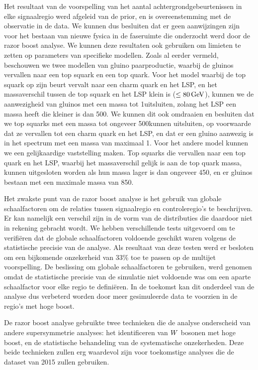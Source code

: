 Het resultaat van de voorspelling van het aantal achtergrondgebeurtenissen in elke signaalregio werd
afgeleid van de prior, en is overeenstemming met de observatie in de data. We kunnen dus besluiten
dat er geen aanwijzingen zijn voor het bestaan van nieuwe fysica in de faseruimte die onderzocht
werd door de razor boost analyse. We kunnen deze resultaten ook gebruiken om limieten te zetten op
parameters van specifieke modellen. Zoals al eerder vermeld, beschouwen we twee modellen van gluino
paarproductie, waarbij de gluinos vervallen naar een top squark en een top quark. Voor het model
waarbij de top squark op zijn beurt vervalt naar een charm quark en het LSP, en het massaverschil
tussen de top squark en het LSP klein is ($\leq 80\,\text{Ge\hspace{-.08em}V}$), kunnen we de aanwezigheid van gluinos met
een massa tot 1\TeV uitsluiten, zolang het LSP een massa heeft die kleiner is dan 500\GeV. We kunnen
dit ook omdraaien en besluiten dat we top squarks met een massa tot ongeveer 500\GeV kunnen
uitsluiten, op voorwaarde dat ze vervallen tot een charm quark en het LSP, en dat er een gluino
aanwezig is in het spectrum met een massa van maximaal 1\TeV. 
Voor het andere model kunnen we een gelijkaardige vaststelling maken. Top squarks die vervallen
naar een top quark en het LSP, waarbij het massaverschil gelijk is aan de top quark massa, kunnen
uitgesloten worden als hun massa lager is dan ongeveer 450\GeV, en er gluinos bestaan met een
maximale massa van 850\GeV. 

Het zwakste punt van de razor boost analyse is het gebruik van globale schaalfactoren om de
relaties tussen signaalregio en controleregio's te beschrijven. Er kan namelijk een verschil zijn
in de vorm van de distributies die daardoor niet in rekening gebracht wordt. We hebben
verschillende tests uitgevoerd om te verifi\"eren dat de globale schaalfactoren voldoende geschikt
waren volgens de statistische precisie van de analyse. Als resultaat van deze testen werd er
besloten om een bijkomende onzekerheid van 33\% toe te passen op de multijet voorspelling. De
beslissing om globale schaalfactoren te gebruiken, werd genomen omdat de statistische precisie van
de simulatie niet voldoende was om een aparte schaalfactor voor elke regio te defini\"eren. In de
toekomst kan dit onderdeel van de analyse dus verbeterd worden door meer gesimuleerde data te
voorzien in de regio's met hoge boost. 

De razor boost analyse gebruikte twee technieken die de analyse onderscheid van andere
supersymmetrie analyses: het identificeren van $W$ bosonen met hoge boost, en de statistische
behandeling van de systematische onzekerheden. Deze beide technieken zullen erg waardevol zijn voor
toekomstige analyses die de dataset van 2015 zullen gebruiken. 

